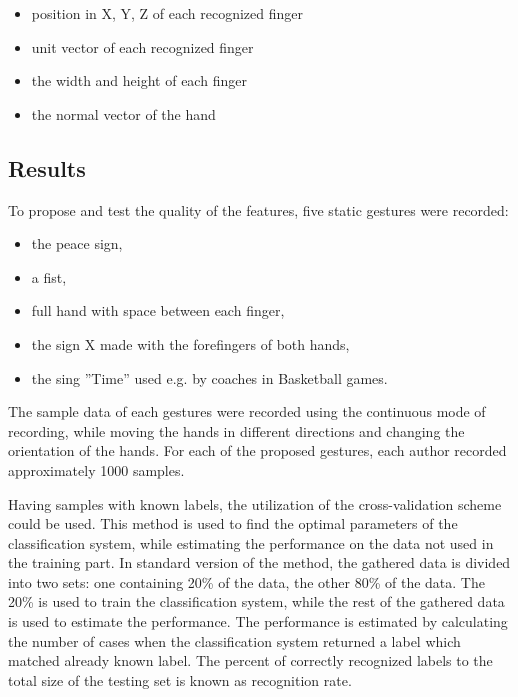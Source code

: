 \begin{itemize}
\item position in X, Y, Z of each recognized finger
\item unit vector of each recognized finger
\item the width and height of each finger
\item the normal vector of the hand
\end{itemize}

\subsection{Results}

To propose and test the quality of the features, five static gestures were recorded:
\begin{itemize}
\item the peace sign,
\item a fist,
\item full hand with space between each finger,
\item the sign X made with the forefingers of both hands,
\item the sing ''Time'' used e.g. by coaches in Basketball games.
\end{itemize} 

The sample data of each gestures were recorded using the continuous mode of recording, while moving the hands in different directions and changing the orientation of the hands. 
For each of the proposed gestures, each author recorded approximately 1000 samples.

Having samples with known labels, the utilization of the cross-validation scheme could be used. 
This method is used to find the optimal parameters of the classification system, while estimating the performance on the data not used in the training part. 
In standard version of the method, the gathered data is divided into two sets: one containing 20\% of the data, the other 80\% of the data. 
The 20\% is used to train the classification system, while the rest of the gathered data is used to estimate the performance. 
The performance is estimated by calculating the number of cases when the classification system returned a label which matched already known label. 
The percent of correctly recognized labels to the total size of the testing set is known as recognition rate.

